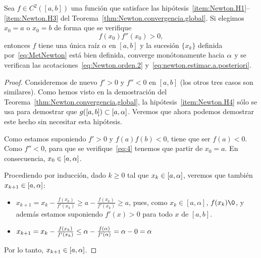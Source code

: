 \begin{corollary}
  Sea $f \in C^2([a,b])$ una función que satisface las
  hipótesis~\ref{item:Newton.H1}--\ref{item:Newton.H3} del
  Teorema~\ref{thm:Newton.convergencia.global}. Si elegimos $x_0=a$
  o $x_0=b$ de forma que se verifique
  \begin{equation}
    \label{eq:4}
    f(x_0) f''(x_0) > 0,
  \end{equation}
  entonces $f$ tiene una única raíz $\alpha$ en $[a,b]$ y la
  sucesión $\{x_k\}$ definida por~\eqref{eq:MetNewton} está bien
  definida, converge monótonamente hacia $\alpha$ y se verifican las
  acotaciones~\eqref{eq:Newton.orden.2}
  y~\eqref{eq:newton.estimac.a.posteriori}.
  \label{cor:regla.fourier}
\end{corollary}
\begin{proof}
  Consideremos de nuevo $f'>0$ y $f''<0$ en $[a,b]$ (los otros tres
  casos son similares). Como hemos visto en la demostración del
  Teorema~\ref{thm:Newton.convergencia.global}, la
  hipótesis~\ref{item:Newton.H4} sólo se usa para demostrar que
  $g([a,b])\subset [a,\alpha]$. Veremos que ahora podemos demostrar
  este hecho sin necesitar esta hipótesis.

  Como estamos suponiendo $f'>0$ y $f(a)f(b)<0$, tiene que ser
    $f(a)<0$.
  Como $f''<0$, para que se verifique~\eqref{eq:4} tenemos que partir
  de $x_0=a$. En consecuencia, $x_0\in[a,\alpha]$.

  Procediendo por inducción, dado $k\ge 0$ tal que $x_k\in [a,\alpha]$, veremos que
  también $x_{k+1}\in [a,\alpha]$:
  \begin{itemize}
  \item
    $x_{k+1}=x_k-\frac{f(x_k)}{f'(x_k)} \ge a - \frac{f(x_k)}{f'(x_k)}
    \ge a$,
    pues, como $x_k\in [a,\alpha]$, $f(x_k)\0$, y además estamos
    suponiendo $f'(x)>0$ para todo $x$ de $[a,b]$.
  \item
    $x_{k+1}=x_k-\frac{f(x_k)}{f'(x_k)} \le
    \alpha-\frac{f(\alpha)}{f'(\alpha)}=\alpha-0 =\alpha$
  \end{itemize}
  Por lo tanto,  $x_{k+1}\in [a,\alpha]$.

\end{proof}

